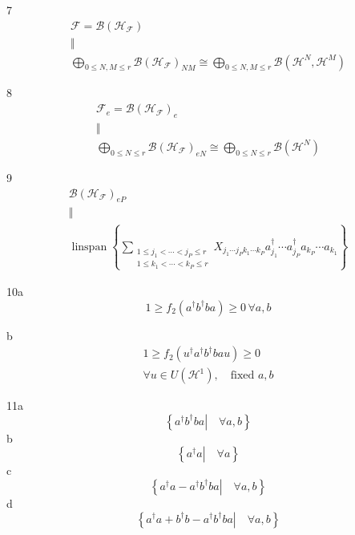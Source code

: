 \documentclass[aps,preprint]{revtex4}%
\begin{document}
7%
\begin{gather*}
\mathcal{F}=\mathcal{B}\left(  \mathcal{H}_{\mathcal{F}}\right) \\
\Vert\\%
{\displaystyle\bigoplus\limits_{0\leq N,M\leq r}}
\mathcal{B}\left(  \mathcal{H}_{\mathcal{F}}\right)  _{NM}\cong%
{\displaystyle\bigoplus\limits_{0\leq N,M\leq r}}
\mathcal{B}\left(  \mathcal{H}^{N},\mathcal{H}^{M}\right)
\end{gather*}


8%
\begin{gather*}
\mathcal{F}_{e}=\mathcal{B}\left(  \mathcal{H}_{\mathcal{F}}\right)  _{e}\\
\Vert\\%
{\displaystyle\bigoplus\limits_{0\leq N\leq r}}
\mathcal{B}\left(  \mathcal{H}_{\mathcal{F}}\right)  _{eN}\cong%
{\displaystyle\bigoplus\limits_{0\leq N\leq r}}
\mathcal{B}\left(  \mathcal{H}^{N}\right)
\end{gather*}


9
\begin{gather*}
\mathcal{B}\left(  \mathcal{H}_{\mathcal{F}}\right)  _{eP}\\
\Vert\\
\operatorname*{linspan}\left\{  \sum_{\substack{1\leq j_{1}<\cdots<j_{P}\leq
r\\1\leq k_{1}<\cdots<k_{P}\leq r}}X_{j_{1}\cdots j_{P}k_{1}\cdots k_{P}%
}a_{j_{1}}^{\dagger}\cdots a_{j_{P}}^{\dagger}a_{k_{P}}\cdots a_{k_{1}%
}\right\}
\end{gather*}


10a%
\[
1\geq f_{2}\left(  a^{\dagger}b^{\dagger}ba\right)  \geq0\,\forall a,b
\]


b%
\begin{gather*}
1\geq f_{2}\left(  u^{\dagger}a^{\dagger}b^{\dagger}bau\right)  \geq0\,\\
\forall u\in U\left(  \mathcal{H}^{1}\right)  ,\quad\text{fixed }a,b
\end{gather*}


11a%
\[
\left\{  \left.  a^{\dagger}b^{\dagger}ba\right\vert \quad\forall a,b\right\}
\]
b%
\[
\left\{  \left.  a^{\dagger}a\right\vert \quad\forall a\right\}
\]
c%
\[
\left\{  \left.  a^{\dagger}a-a^{\dagger}b^{\dagger}ba\right\vert \quad\forall
a,b\right\}
\]
d%
\[
\left\{  \left.  a^{\dagger}a+b^{\dagger}b-a^{\dagger}b^{\dagger}ba\right\vert
\quad\forall a,b\right\}
\]
\end{document}
